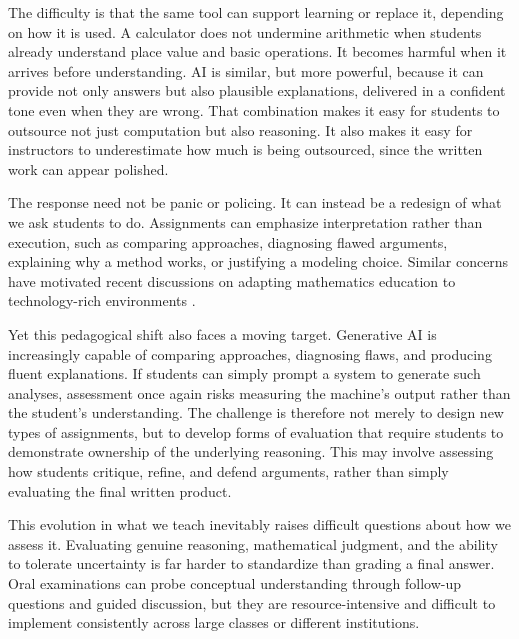 \documentclass[12pt]{article}
\begin{document}
The difficulty is that the same tool can support learning or replace it, depending on how it is used. A calculator does not undermine arithmetic when students already understand place value and basic operations. It becomes harmful when it arrives before understanding. AI is similar, but more powerful, because it can provide not only answers but also plausible explanations, delivered in a confident tone even when they are wrong. That combination makes it easy for students to outsource not just computation but also reasoning. It also makes it easy for instructors to underestimate how much is being outsourced, since the written work can appear polished.

The response need not be panic or policing. It can instead be a redesign of what we ask students to do. Assignments can emphasize interpretation rather than execution, such as comparing approaches, diagnosing flawed arguments, explaining why a method works, or justifying a modeling choice. Similar concerns have motivated recent discussions on adapting mathematics education to technology-rich environments \cite{opesemowo2024}.

Yet this pedagogical shift also faces a moving target. Generative AI is increasingly capable of comparing approaches, diagnosing flaws, and producing fluent explanations. If students can simply prompt a system to generate such analyses, assessment once again risks measuring the machine's output rather than the student's understanding. The challenge is therefore not merely to design new types of assignments, but to develop forms of evaluation that require students to demonstrate ownership of the underlying reasoning. This may involve assessing how students critique, refine, and defend arguments, rather than simply evaluating the final written product.

This evolution in what we teach inevitably raises difficult questions about how we assess it. Evaluating genuine reasoning, mathematical judgment, and the ability to tolerate uncertainty is far harder to standardize than grading a final answer. Oral examinations can probe conceptual understanding through follow-up questions and guided discussion, but they are resource-intensive and difficult to implement consistently across large classes or different institutions.
\end{document}
